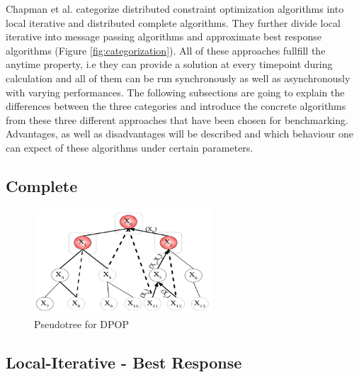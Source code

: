 Chapman et al. categorize distributed constraint optimization algorithms into local iterative and distributed complete algorithms. They further divide local iterative into message passing algorithms and approximate best response algorithms (Figure \ref{fig:categorization}). All of these approaches fullfill the anytime property, i.e they can provide a solution at every timepoint during calculation and all of them can be run synchronously as well as asynchronously with varying performances.
The following subsections are going to explain the differences between the three categories and introduce the concrete algorithms from these three different approaches that have been chosen for benchmarking. Advantages, as well as disadvantages will be described and which behaviour one can expect of these algorithms under certain parameters.

    
\subsection{Complete}

\cite{Chapman2011}


    
    

\begin{figure}[H]
\centering
\includegraphics[width=250px]{graphics/pseudotree}
\caption{Pseudotree for DPOP \cite{Petcu2003}}
\label{fig:pseudotree}
\end{figure}





\subsection{Local-Iterative - Best Response}

